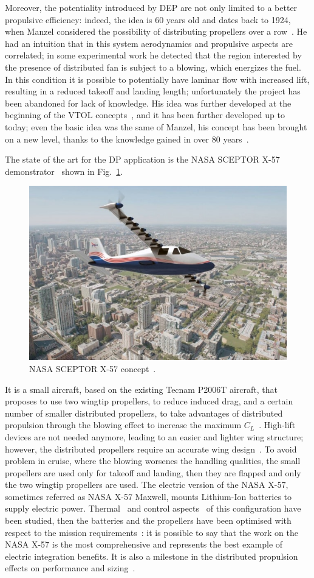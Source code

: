 Moreover, the potentiality introduced by DEP are not only limited to a better propulsive efficiency: indeed, the idea is 60 years old and dates back to 1924, when Manzel considered the possibility of distributing propellers over a row~\cite{bib:manzel}.
He had an intuition that in this system aerodynamics and propulsive aspects are correlated; in some experimental work he detected that the region interested by the presence of distributed fan is subject to a blowing, which energizes the fuel. 
In this condition it is possible to potentially have laminar flow with increased lift, resulting in a reduced takeoff and landing length; unfortunately the project has been abandoned for lack of knowledge. 
His idea was further developed at the beginning of the VTOL concepts~\cite{bib:malvestuto}, and it has been further developed up to today; even the basic idea was the same of Manzel, his concept has been brought on a new level, thanks to the knowledge gained in over 80 years~\cite{bib:gohardani_book}. 

The state of the art for the DP application is the NASA SCEPTOR X-57 demonstrator~\cite{bib:borer_sceptor} shown in Fig.~\ref{fig:nasa_x57}. 
\begin{figure}[h!]
	\centering
	\includegraphics[keepaspectratio, width=0.5\linewidth]{images/chap1/nasa_x57.jpg}
	\caption{NASA SCEPTOR X-57 concept~\cite{bib:borer_sceptor}.}
	\label{fig:nasa_x57}
\end{figure}
It is a small aircraft, based on the existing Tecnam P2006T aircraft, that proposes to use two wingtip propellers, to reduce induced drag, and a certain number of smaller distributed propellers, to take advantages of distributed propulsion through the blowing effect to increase the maximum $C_L$~\cite{bib:deere_2017b}. 
High-lift devices are not needed anymore, leading to an easier and lighter wing structure; however, the distributed propellers require an accurate wing design~\cite{bib:deere_2017a}. 
To avoid problem in cruise, where the blowing worsenes the handling qualities, the small propellers are used only for takeoff and landing, then they are flapped and only the two wingtip propellers are used. 
The electric version of the NASA X-57, sometimes referred as NASA X-57 Maxwell, mounts Lithium-Ion batteries to supply electric power. 
Thermal~\cite{bib:schnulo} and control aspects~\cite{bib:clarke} of this configuration have been studied, then the batteries and the propellers have been optimised with respect to the mission requirements~\cite{bib:hwang_x57}: it is possible to say that the work on the NASA X-57 is the most comprehensive and represents the best example of electric integration benefits. 
It is also a milestone in the distributed propulsion effects on performance and sizing~\cite{bib:moore_2018}. 

